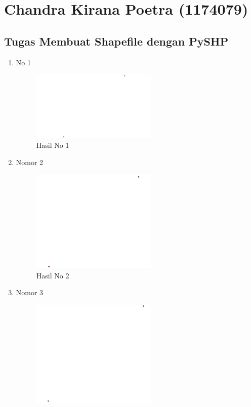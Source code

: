 \section{Chandra Kirana Poetra (1174079)}
\subsection{Tugas Membuat Shapefile dengan PySHP}
\begin{enumerate}
	\item No 1
	
	\begin{figure}[H]
		\includegraphics[width=6cm]{figures/Tugas2/1174079/no1.PNG}
		\centering
		\caption{Hasil No 1}
	\end{figure}
	\item Nomor 2
	
	\begin{figure}[H]
		\includegraphics[width=6cm]{figures/Tugas2/1174079/no2.PNG}
		\centering
		\caption{Hasil No 2}
	\end{figure}
	\item Nomor 3
	
	\begin{figure}[H]
		\includegraphics[width=6cm]{figures/Tugas2/1174079/no3.PNG}

\end{figure}
\end{enumerate}
